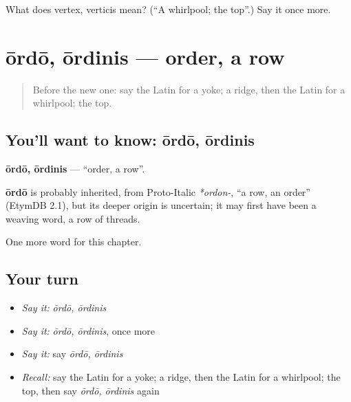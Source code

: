 \begin{tcolorbox}[breakable,colback=teal!4,colframe=teal!35!black,title={Before you move on}]
What does vertex, verticis mean? (\textquotedblleft{}A whirlpool; the top\textquotedblright{}.) Say it once more.
\end{tcolorbox}
\section[ōrdō, ōrdinis]{ōrdō, ōrdinis — order, a row}

\label{lesson:LA-C228-ordo}



\begin{quote}
Before the new one: say the Latin for a yoke; a ridge, then the Latin for a whirlpool; the top.
\end{quote}

\subsection*{You'll want to know: ōrdō, ōrdinis}
\textbf{ōrdō, ōrdinis} — \textquotedblleft{}order, a row\textquotedblright{}.

\begin{cousinweb}
\textbf{ōrdō} is probably inherited, from Proto-Italic \emph{*ordon-}, \textquotedblleft{}a row, an order\textquotedblright{} (EtymDB 2.1), but its deeper origin is uncertain; it may first have been a weaving word, a row of threads.
\end{cousinweb}

\begin{grammarlens}[title={What you've built}]
One more word for this chapter.
\end{grammarlens}

\subsection*{Your turn}
\begin{itemize}
\raggedright
  \item \emph{Say it:} \emph{ōrdō, ōrdinis}
  \item \emph{Say it:} \emph{ōrdō, ōrdinis}, once more
  \item \emph{Say it:} say \emph{ōrdō, ōrdinis}
  \item \emph{Recall:} say the Latin for a yoke; a ridge, then the Latin for a whirlpool; the top, then say \emph{ōrdō, ōrdinis} again
\end{itemize}

